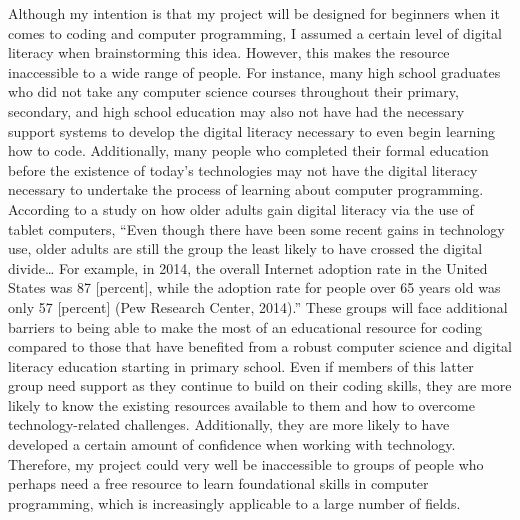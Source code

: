 \documentclass[10pt,twocolumn]{article}
\begin{document}
Although my intention is that my project will be designed for beginners when it comes to coding and computer programming, I assumed a certain level of digital literacy when brainstorming this idea. However, this makes the resource inaccessible to a wide range of people. For instance, many high school graduates who did not take any computer science courses throughout their primary, secondary, and high school education may also not have had the necessary support systems to develop the digital literacy necessary to even begin learning how to code. Additionally, many people who completed their formal education before the existence of today’s technologies may not have the digital literacy necessary to undertake the process of learning about computer programming. According to a study on how older adults gain digital literacy via the use of tablet computers, “Even though there have been some recent gains in technology use, older adults are still the group the least likely to have crossed the digital divide… For example, in 2014, the overall Internet adoption rate in the United States was 87 [percent], while the adoption rate for people over 65 years old was only 57 [percent] (Pew Research Center, 2014).”\cite{Adults} These groups will face additional barriers to being able to make the most of an educational resource for coding compared to those that have benefited from a robust computer science and digital literacy education starting in primary school. Even if members of this latter group need support as they continue to build on their coding skills, they are more likely to know the existing resources available to them and how to overcome technology-related challenges. Additionally, they are more likely to have developed a certain amount of confidence when working with technology. Therefore, my project could very well be inaccessible to groups of people who perhaps need a free resource to learn foundational skills in computer programming, which is increasingly applicable to a large number of fields.
\end{document}
